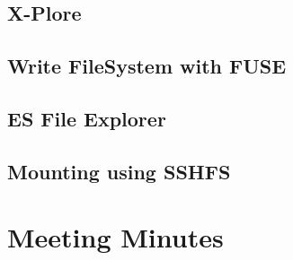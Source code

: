 \section{X-Plore}

\section{Write FileSystem with FUSE}

\section{ES File Explorer}

\section{Mounting using SSHFS}


\chapter{Meeting Minutes}
\label{meetingminutes}
